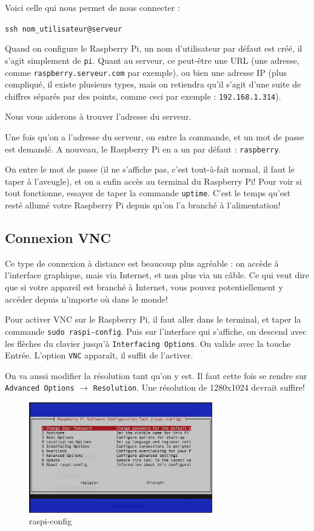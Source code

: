 Voici celle qui nous permet de nous connecter :

\texttt{ssh nom\_utilisateur@serveur}

Quand on configure le Raspberry Pi, un nom d'utilisateur par défaut est créé, il s'agit simplement de \texttt{pi}. Quant au serveur, ce peut-être une URL (une adresse, comme \texttt{raspberry.serveur.com} par exemple), ou bien une adresse IP (plus compliqué, il existe plusieurs types, mais on retiendra qu'il s'agit d'une suite de chiffres séparés par des points, comme ceci par exemple : \texttt{192.168.1.314}).

Nous vous aiderons à trouver l'adresse du serveur.

Une fois qu'on a l'adresse du serveur, on entre la commande, et un mot de passe est demandé. A nouveau, le Raspberry Pi en a un par défaut : \texttt{raspberry}.

On entre le mot de passe (il ne s'affiche pas, c'est tout-à-fait normal, il faut le taper à l'aveugle), et on a enfin accès au terminal du Raspberry Pi! Pour voir si tout fonctionne, essayez de taper la commande \texttt{uptime}. C'est le temps qu'est resté allumé votre Raspberry Pi depuis qu'on l'a branché à l'alimentation!

\subsection{Connexion VNC}

Ce type de connexion à distance est beaucoup plus agréable : on accède à l'interface graphique, mais via Internet, et non plus via un câble. Ce qui veut dire que si votre appareil est branché à Internet, vous pouvez potentiellement y accéder depuis n'importe où dans le monde!

Pour activer VNC sur le Raspberry Pi, il faut aller dans le terminal, et taper la commande \texttt{sudo raspi-config}. Puis sur l'interface qui s'affiche, on descend avec les flèches du clavier jusqu'à \texttt{Interfacing Options}. On valide avec la touche Entrée. L'option \texttt{VNC} apparaît, il suffit de l'activer.

On va aussi modifier la résolution tant qu'on y est. Il faut cette fois se rendre sur \texttt{Advanced Options} $\rightarrow$ \texttt{Resolution}. Une résolution de 1280x1024 devrait suffire!

\begin{figure}[h!]
    \begin{center}
        \includegraphics[width=8cm]{img/raspi-config.png}
    \end{center}
    \caption{raspi-config}
    \label{raspi-config}
\end{figure}

